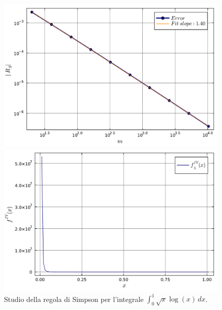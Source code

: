 \documentclass[letterpaper, 12pt]{article}
\numberwithin{equation}{section}    %
\begin{document}
\begin{figure}[!ht]
    \centering
    \begin{minipage}[b]{0.42\textwidth}
        \includegraphics[width=\textwidth]{5145.pdf}
    \end{minipage}
    \hspace{0.5cm}
    \begin{minipage}[b]{0.42\textwidth}
        \includegraphics[width=\textwidth]{5145_2.pdf}
    \end{minipage}
    \caption{Studio della regola di Simpson per l'integrale $\int_0^1 \sqrt{x} \log(x) \, dx$.}
    \label{fig:es5_1_4_5}
\end{figure}
\end{document}
